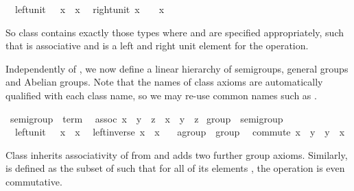 \begin{isabellebody}
\ \ left{\isacharunderscore}unit{\isacharcolon}\ {\isachardoublequote}{\isasymunit}\ {\isasymodot}\ x\ {\isacharequal}\ x{\isachardoublequote}\isanewline
\ \ right{\isacharunderscore}unit{\isacharcolon}\ {\isachardoublequote}x\ {\isasymodot}\ {\isasymunit}\ {\isacharequal}\ x{\isachardoublequote}%
\begin{isamarkuptext}%
\noindent So class  contains exactly those types \isa{{\isasymtau}} where \isa{{\isasymodot}\ {\isasymColon}\ {\isasymtau}\ {\isasymRightarrow}\ {\isasymtau}\ {\isasymRightarrow}\ {\isasymtau}} and \isa{{\isasymunit}\ {\isasymColon}\ {\isasymtau}} are
 specified appropriately, such that \isa{{\isasymodot}} is associative and
 \isa{{\isasymunit}} is a left and right unit element for the \isa{{\isasymodot}}
 operation.%
\end{isamarkuptext}%
%
\begin{isamarkuptext}%
\medskip Independently of , we now define a linear
 hierarchy of semigroups, general groups and Abelian groups.  Note
 that the names of class axioms are automatically qualified with each
 class name, so we may re-use common names such as .%
\end{isamarkuptext}%
\ semigroup\ {\isasymsubseteq}\ {\isachardoublequote}term{\isachardoublequote}\isanewline
\ \ assoc{\isacharcolon}\ {\isachardoublequote}{\isacharparenleft}x\ {\isasymodot}\ y{\isacharparenright}\ {\isasymodot}\ z\ {\isacharequal}\ x\ {\isasymodot}\ {\isacharparenleft}y\ {\isasymodot}\ z{\isacharparenright}{\isachardoublequote}\isanewline
\isanewline
{}\ group\ {\isasymsubseteq}\ semigroup\isanewline
\ \ left{\isacharunderscore}unit{\isacharcolon}\ {\isachardoublequote}{\isasymunit}\ {\isasymodot}\ x\ {\isacharequal}\ x{\isachardoublequote}\isanewline
\ \ left{\isacharunderscore}inverse{\isacharcolon}\ {\isachardoublequote}x{\isasyminv}\ {\isasymodot}\ x\ {\isacharequal}\ {\isasymunit}{\isachardoublequote}\isanewline
\isanewline
{}\ agroup\ {\isasymsubseteq}\ group\isanewline
\ \ commute{\isacharcolon}\ {\isachardoublequote}x\ {\isasymodot}\ y\ {\isacharequal}\ y\ {\isasymodot}\ x{\isachardoublequote}%
\begin{isamarkuptext}%
\noindent Class  inherits associativity of \isa{{\isasymodot}}
 from  and adds two further group axioms. Similarly,
  is defined as the subset of  such that
 for all of its elements \isa{{\isasymtau}}, the operation \isa{{\isasymodot}\ {\isasymColon}\ {\isasymtau}\ {\isasymRightarrow}\ {\isasymtau}\ {\isasymRightarrow}\ {\isasymtau}} is even commutative.%

\end{isamarkuptext}
\end{isabellebody}

